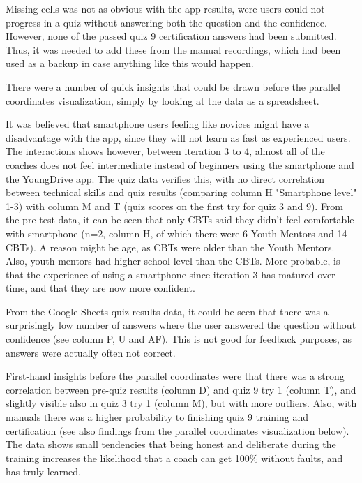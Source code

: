 Missing cells was not as obvious with the app results, were users could not progress in a quiz without answering both the question and the confidence. However, none of the passed quiz 9 certification answers had been submitted. Thus, it was needed to add these from the manual recordings, which had been used as a backup in case anything like this would happen.

There were a number of quick insights that could be drawn before the parallel coordinates visualization, simply by looking at the data as a spreadsheet.

It was believed that smartphone users feeling like novices might have a disadvantage with the app, since they will not learn as fast as experienced users. The interactions shows however, between iteration 3 to 4, almost all of the coaches does not feel intermediate instead of beginners using the smartphone and the YoungDrive app. The quiz data verifies this, with no direct correlation between technical skills and quiz results (comparing column H "Smartphone level" 1-3) with column M and T (quiz scores on the first try for quiz 3 and 9). From the pre-test data, it can be seen that only CBTs said they didn't feel comfortable with smartphone (n=2, column H, of which there were 6 Youth Mentors and 14 CBTs). A reason might be age, as CBTs were older than the Youth Mentors. Also, youth mentors had higher school level than the CBTs. More probable, is that the experience of using a smartphone since iteration 3 has matured over time, and that they are now more confident. %

From the Google Sheets quiz results data, it could be seen that there was a surprisingly low number of answers where the user answered the question without confidence (see column P, U and AF). This is not good for feedback purposes, as answers were actually often not correct.

First-hand insights before the parallel coordinates were that there was a strong correlation between pre-quiz results (column D) and quiz 9 try 1 (column T), and slightly visible also in quiz 3 try 1 (column M), but with more outliers. Also, with manuals there was a higher probability to finishing quiz 9 training and certification (see also findings from the parallel coordinates visualization below). The data shows small tendencies that being honest and deliberate during the training increases the likelihood that a coach can get 100\% without faults, and has truly learned.

